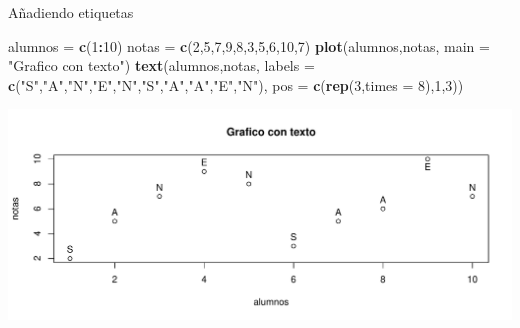 \documentclass[
  ignorenonframetext,
]{beamer}
\newenvironment{Shaded}{\begin{snugshade}}{\end{snugshade}}
\newcommand{\AttributeTok}[1]{\textcolor[rgb]{0.13,0.29,0.53}{#1}}
\newcommand{\DecValTok}[1]{\textcolor[rgb]{0.00,0.00,0.81}{#1}}
\newcommand{\FunctionTok}[1]{\textcolor[rgb]{0.13,0.29,0.53}{\textbf{#1}}}
\newcommand{\NormalTok}[1]{#1}
\newcommand{\OtherTok}[1]{\textcolor[rgb]{0.56,0.35,0.01}{#1}}
\newcommand{\SpecialCharTok}[1]{\textcolor[rgb]{0.81,0.36,0.00}{\textbf{#1}}}
\newcommand{\StringTok}[1]{\textcolor[rgb]{0.31,0.60,0.02}{#1}}
\begin{document}
\begin{frame}[fragile]{Añadiendo etiquetas}
\label{auxf1adiendo-etiquetas}
\begin{Shaded}
\begin{Highlighting}[]
\NormalTok{alumnos }\OtherTok{=} \FunctionTok{c}\NormalTok{(}\DecValTok{1}\SpecialCharTok{:}\DecValTok{10}\NormalTok{)}
\NormalTok{notas }\OtherTok{=} \FunctionTok{c}\NormalTok{(}\DecValTok{2}\NormalTok{,}\DecValTok{5}\NormalTok{,}\DecValTok{7}\NormalTok{,}\DecValTok{9}\NormalTok{,}\DecValTok{8}\NormalTok{,}\DecValTok{3}\NormalTok{,}\DecValTok{5}\NormalTok{,}\DecValTok{6}\NormalTok{,}\DecValTok{10}\NormalTok{,}\DecValTok{7}\NormalTok{)}
\FunctionTok{plot}\NormalTok{(alumnos,notas, }\AttributeTok{main =} \StringTok{"Grafico con texto"}\NormalTok{)}
\FunctionTok{text}\NormalTok{(alumnos,notas, }
     \AttributeTok{labels =} \FunctionTok{c}\NormalTok{(}\StringTok{"S"}\NormalTok{,}\StringTok{"A"}\NormalTok{,}\StringTok{"N"}\NormalTok{,}\StringTok{"E"}\NormalTok{,}\StringTok{"N"}\NormalTok{,}\StringTok{"S"}\NormalTok{,}\StringTok{"A"}\NormalTok{,}\StringTok{"A"}\NormalTok{,}\StringTok{"E"}\NormalTok{,}\StringTok{"N"}\NormalTok{), }
     \AttributeTok{pos =} \FunctionTok{c}\NormalTok{(}\FunctionTok{rep}\NormalTok{(}\DecValTok{3}\NormalTok{,}\AttributeTok{times =} \DecValTok{8}\NormalTok{),}\DecValTok{1}\NormalTok{,}\DecValTok{3}\NormalTok{))}
\end{Highlighting}
\end{Shaded}

\begin{center}\includegraphics[width=0.8\linewidth]{R_base_files/figure-beamer/unnamed-chunk-41-1} \end{center}
\end{frame}
\end{document}
